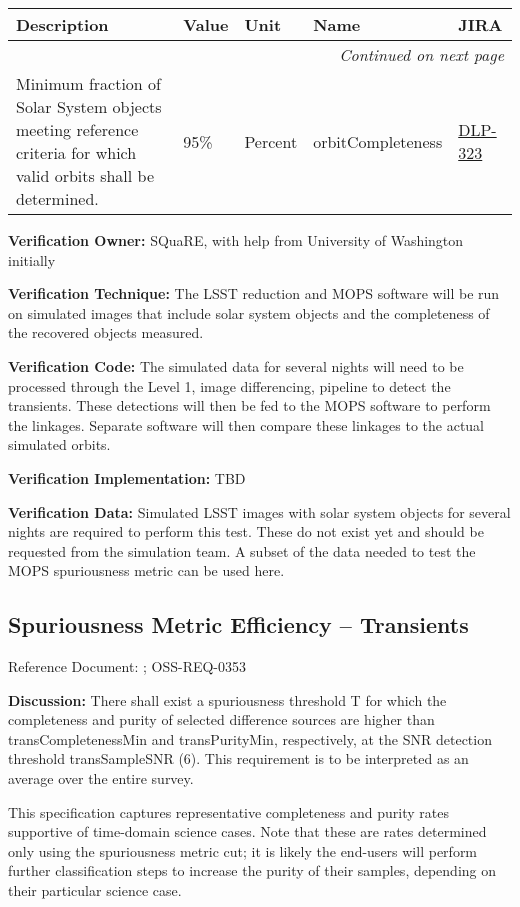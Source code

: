 \documentclass[DM,lsstdraft,toc]{lsstdoc}
\makeatletter
\newcommand{\jira}[1]{\href{https://jira.lsstcorp.org/browse/#1}{#1}}
\newenvironment{metric}[0]{%
\setlength\LTleft{0pt}
\setlength\LTright{\fill}
\begin{longtable}[]{@{}p{0.4\textwidth}lp{0.75in}p{1.3in}p{0.75in}@{}}

\hline \textbf{Description} & \textbf{Value} & \textbf{Unit} & \textbf{Name} & \textbf{JIRA} \\ \hline
\endhead

\hline \multicolumn{5}{r}{\emph{Continued on next page}} \\
\endfoot

\hline\hline
\endlastfoot
}{%
\hline
\end{longtable}
}
\makeatother
\begin{document}
\begin{metric}
Minimum fraction of Solar System objects meeting reference criteria for
which valid orbits shall be determined. & 95\% & Percent &
orbitCompleteness & \jira{DLP-323}\tabularnewline
\end{metric}

\textbf{Verification Owner:} SQuaRE, with help from University of
Washington initially

\textbf{Verification Technique:} The LSST reduction and MOPS software
will be run on simulated images that include solar system objects and
the completeness of the recovered objects measured.

\textbf{Verification Code:} The simulated data for several nights will
need to be processed through the Level 1, image differencing, pipeline
to detect the transients. These detections will then be fed to the MOPS
software to perform the linkages. Separate software will then compare
these linkages to the actual simulated orbits.

\textbf{Verification Implementation:} TBD

\textbf{Verification Data:} Simulated LSST images with solar system
objects for several nights are required to perform this test. These do
not exist yet and should be requested from the simulation team. A subset
of the data needed to test the MOPS spuriousness metric can be used
here.

\subsection{Spuriousness Metric Efficiency --
Transients}\label{spuriousness-metric-efficiency-transients}

Reference Document: ; OSS-REQ-0353

\textbf{Discussion:} There shall exist a spuriousness threshold T for
which the completeness and purity of selected difference sources are
higher than transCompletenessMin and transPurityMin, respectively, at
the SNR detection threshold transSampleSNR (6). This requirement is to
be interpreted as an average over the entire survey.

This specification captures representative completeness and purity rates
supportive of time-domain science cases. Note that these are rates
determined only using the spuriousness metric cut; it is likely the
end-users will perform further classification steps to increase the
purity of their samples, depending on their particular science case.
\end{document}
